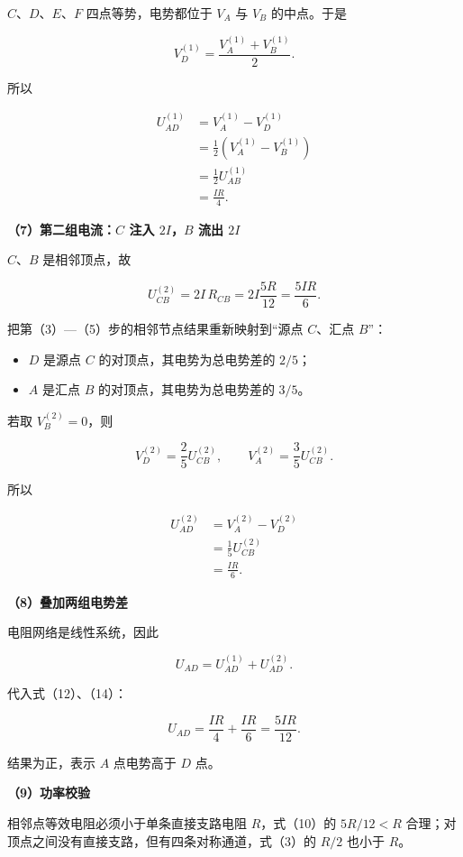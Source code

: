 \documentclass[12pt,a4paper,UTF8]{ctexart}
\newcommand{\tightlist}{\setlength{\itemsep}{0pt}\setlength{\parskip}{0pt}}
\begin{document}
\(C\)、\(D\)、\(E\)、\(F\) 四点等势，电势都位于 \(V_A\) 与 \(V_B\)
的中点。于是

\[
V_D^{(1)}=\frac{V_A^{(1)}+V_B^{(1)}}2.
\]

所以

\[
\begin{aligned}
U_{AD}^{(1)}
&=V_A^{(1)}-V_D^{(1)}\\
&=\frac12\left(V_A^{(1)}-V_B^{(1)}\right)\\
&=\frac12U_{AB}^{(1)}\\
&=\frac{IR}{4}.
\end{aligned}
\tag{12}
\]

\textbf{（7）第二组电流：\(C\) 注入 \(2I\)，\(B\) 流出 \(2I\)}

\(C\)、\(B\) 是相邻顶点，故

\[
U_{CB}^{(2)}
=2I\,R_{CB}
=2I\frac{5R}{12}
=\frac{5IR}{6}.
\tag{13}
\]

把第（3）---（5）步的相邻节点结果重新映射到``源点 \(C\)、汇点 \(B\)''：

\begin{itemize}
\tightlist
\item
  \(D\) 是源点 \(C\) 的对顶点，其电势为总电势差的 \(2/5\)；
\item
  \(A\) 是汇点 \(B\) 的对顶点，其电势为总电势差的 \(3/5\)。
\end{itemize}

若取 \(V_B^{(2)}=0\)，则

\[
V_D^{(2)}=\frac25U_{CB}^{(2)},
\qquad
V_A^{(2)}=\frac35U_{CB}^{(2)}.
\]

所以

\[
\begin{aligned}
U_{AD}^{(2)}
&=V_A^{(2)}-V_D^{(2)}\\
&=\frac15U_{CB}^{(2)}\\
&=\frac{IR}{6}.
\end{aligned}
\tag{14}
\]

\textbf{（8）叠加两组电势差}

电阻网络是线性系统，因此

\[
U_{AD}=U_{AD}^{(1)}+U_{AD}^{(2)}.
\]

代入式（12）、（14）：

\[
\boxed{
U_{AD}
=\frac{IR}{4}+\frac{IR}{6}
=\frac{5IR}{12}
}.
\tag{15}
\]

结果为正，表示 \(A\) 点电势高于 \(D\) 点。

\textbf{（9）功率校验}

相邻点等效电阻必须小于单条直接支路电阻 \(R\)，式（10）的 \(5R/12<R\)
合理；对顶点之间没有直接支路，但有四条对称通道，式（3）的 \(R/2\) 也小于
\(R\)。
\end{document}

